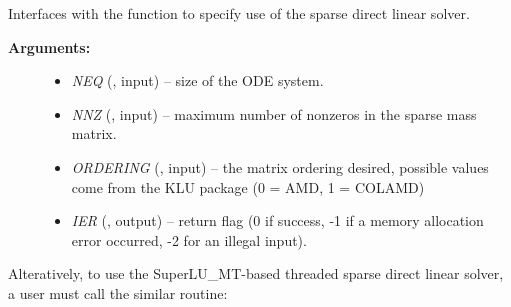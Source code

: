 \documentclass[letterpaper,10pt,english]{sphinxmanual}
\begin{document}
\begin{fulllineitems}
\label{f_interface/Usage:f/_/FARKMASSKLU}
Interfaces with the {\hyperref[c_interface/User_callable:c.ARKMassKLU]{\emph{}}} function to
specify use of the sparse direct linear solver.
\begin{description}
\item[{\textbf{Arguments:}}] \leavevmode\begin{itemize}
\item {} 
\emph{NEQ} (, input) -- size of the ODE system.

\item {} 
\emph{NNZ} (, input) -- maximum number of nonzeros in
the sparse mass matrix.

\item {} 
\emph{ORDERING} (, input) -- the matrix ordering desired,
possible values come from the KLU package (0 = AMD, 1 = COLAMD)

\item {} 
\emph{IER} (, output) -- return flag (0 if success, -1 if a
memory allocation error occurred, -2 for an illegal input).

\end{itemize}

\end{description}

\end{fulllineitems}


Alteratively, to use the SuperLU\_MT-based threaded sparse direct
linear solver, a user must call the similar {\hyperref[f_interface/Usage:f/_/FARKMASSSUPERLUMT]{\emph{}}}
routine:
\end{document}
